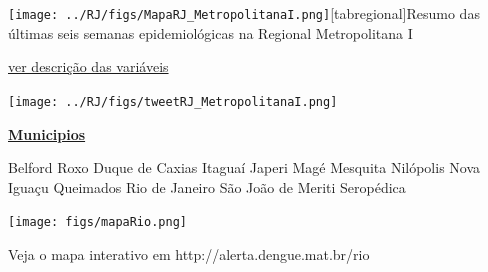 \documentclass[10pt]{article} %
\begin{document}
  
\begin{minipage}[t]{.66\linewidth}\hypertarget{regional}{}\texttt{[image: ../RJ/figs/MapaRJ\_MetropolitanaI.png]}[tabregional]{Resumo das últimas seis semanas epidemiológicas na Regional Metropolitana I }\begin{center}\end{center}\small{\hyperlink{vartab}{ver descrição das variáveis}}\begin{center}\texttt{[image: ../RJ/figs/tweetRJ\_MetropolitanaI.png]}\end{center}\end{minipage}\hfill\begin{minipage}[t]{.30\linewidth}\begin{mdframed}[style=sidebar,frametitle={}]\textbf{\hyperlink{municips}{Municipios}}\begin{itemize}\gsquare Belford Roxo 
\gsquare Duque de Caxias 
\gsquare Itaguaí 
\gsquare Japeri 
\gsquare Magé 
\gsquare Mesquita 
\gsquare Nilópolis 
\gsquare Nova Iguaçu 
\gsquare Queimados 
\gsquare Rio de Janeiro 
\gsquare São João de Meriti 
\gsquare Seropédica \end{itemize}\BackToContents\end{mdframed}\hfill\end{minipage}\newpage  %
\begin{minipage}[t]{0.6\linewidth} %
\hypertarget{mun}{} %


\texttt{[image: figs/mapaRio.png]}

\small{Veja o mapa interativo em http://alerta.dengue.mat.br/rio}

\vspace{2cm}

\begin{center}

\end{center}

\BackToContents %
\end{minipage}
\end{document}
